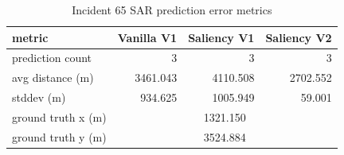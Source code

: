 \begin{table}[ht]
\centering
\caption{Incident 65 SAR prediction error metrics}
\label{tab:sar-incident-65}
\begin{tabular}{lrrr}
\hline
metric & Vanilla V1 & Saliency V1 & Saliency V2 \\
\hline
prediction count & 3 & 3 & 3 \\
avg distance (m) & 3461.043 & 4110.508 & 2702.552 \\
stddev (m) & 934.625 & 1005.949 & 59.001 \\
ground truth x (m) & \multicolumn{3}{c}{1321.150} \\
ground truth y (m) & \multicolumn{3}{c}{3524.884} \\
\hline
\end{tabular}
\end{table}
